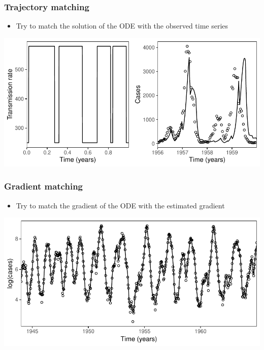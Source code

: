 \documentclass{beamer}
\begin{document}
\begin{frame}
\frametitle{Trajectory matching}
\begin{itemize}
	\item Try to match the solution of the ODE with the observed time series
\end{itemize}
\begin{center}
\includegraphics[width=\textwidth]{traj3.pdf}
\end{center}
\end{frame}

\begin{frame}
\frametitle{Gradient matching}
\begin{itemize}
	\item Try to match the gradient of the ODE with the estimated gradient
\end{itemize}
\begin{center}
\includegraphics[width=\textwidth]{grad1.pdf}
\end{center}
\end{frame}
\end{document}
